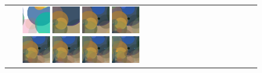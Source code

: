 \documentclass[3p,times,procedia]{elsarticle}
\begin{document}
\begin{figure}[H]
    \centering
    \begin{tabular}{c c c c c c c c c c c c c}
        \includegraphics[width=12mm]{figures/mul/cafe_terrace_at_night_gen_pass00.png}
        
          \includegraphics[width=12mm]{figures/mul/cafe_terrace_at_nightpass0_best.png}
          
          \includegraphics[width=12mm]{figures/mul/cafe_terrace_at_nightpass1_best.png}
          
          \includegraphics[width=12mm]{figures/mul/cafe_terrace_at_nightpass2_best.png}
          
          \includegraphics[width=12mm]{figures/mul/cafe_terrace_at_nightpass3_best.png}
          
          \includegraphics[width=12mm]{figures/mul/cafe_terrace_at_nightpass4_best.png}
          
          \includegraphics[width=12mm]{figures/mul/cafe_terrace_at_nightpass5_best.png}
          
          \includegraphics[width=12mm]{figures/mul/cafe_terrace_at_nightpass6_best.png}
          

\end{tabular}
\end{figure}
\end{document}
